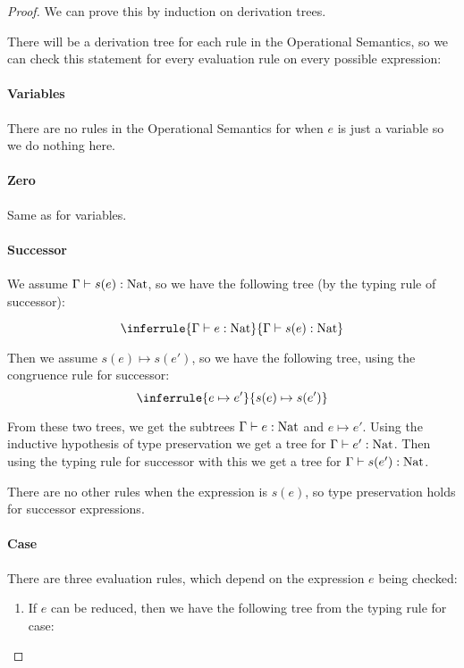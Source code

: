 \begin{proof}
We can prove this by induction on derivation trees.%

There will be a derivation tree  for each rule in the Operational Semantics, so we can check this statement for every evaluation rule on every possible expression:

\paragraph{Variables} There are no rules in the Operational Semantics for when $e$ is just a variable so we do nothing here.

\paragraph{Zero} Same as for variables.

\paragraph{Successor} We  assume $\Gamma \vdash s(e) : \operatorname{Nat}$, so we have the following tree (by the typing rule of successor):

$$
\inferrule { \Gamma \vdash e : \nat }
 {\Gamma \vdash s(e) : \nat}
$$

Then we assume $s(e) \mapsto s(e')$, so we have the following tree, using the congruence rule for successor:
$$
\inferrule { e \mapsto e'} {s(e) \mapsto s(e')}
$$

From these two trees, we get the subtrees $\Gamma \vdash e : \operatorname{Nat}$ and $e \mapsto e'$. Using the inductive  hypothesis of type preservation we get a tree for $\Gamma \vdash e' : \operatorname{Nat}$. Then using the typing rule for successor with this we get a tree for $\Gamma \vdash s(e') : \operatorname{Nat}$. 

There are no other rules when the expression is $s(e)$, so type preservation holds for successor expressions.  

\paragraph{Case} There are three evaluation rules, which depend on the expression $e$ being checked:

\begin{enumerate}
\item{If $e$ can be reduced, then we have the following tree from the typing rule for case:

}
\end{enumerate}
\end{proof}
